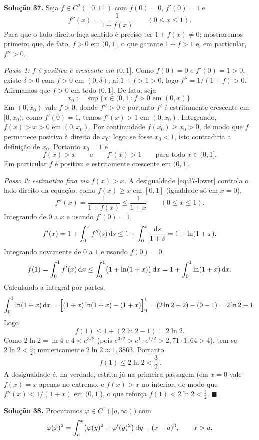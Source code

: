 \bigskip\noindent\textbf{Solução 37.}\quad
Seja $f\in C^2([0,1])$ com $f(0)=0$, $f'(0)=1$ e
\[
f''(x)=\frac{1}{1+f(x)}\qquad(0\le x\le 1).
\]
Para que o lado direito faça sentido é preciso ter $1+f(x)\neq0$; mostraremos primeiro que, de fato, $f>0$ em $(0,1]$, o que garante $1+f>1$ e, em particular, $f''>0$.

\emph{Passo 1: $f$ é positiva e crescente em $(0,1]$.}
Como $f(0)=0$ e $f'(0)=1>0$, existe $\delta>0$ com $f>0$ em $(0,\delta)$; aí $1+f>1>0$, logo $f''=1/(1+f)>0$. Afirmamos que $f>0$ em todo $(0,1]$. De fato, seja
\[
x_0:=\sup\{x\in(0,1]: f>0\text{ em }(0,x)\}.
\]
Em $(0,x_0)$ vale $f>0$, donde $f''>0$ e portanto $f'$ é estritamente crescente em $[0,x_0)$; como $f'(0)=1$, temos $f'(x)>1$ em $(0,x_0)$. Integrando, $f(x)>x>0$ em $(0,x_0)$. Por continuidade $f(x_0)\ge x_0>0$, de modo que $f$ permanece positiva à direita de $x_0$; logo, se fosse $x_0<1$, isto contradiria a definição de $x_0$. Portanto $x_0=1$ e
\begin{equation}\label{eq:37-lower}
f(x)>x\qquad\text{e}\qquad f'(x)>1\qquad\text{para todo }x\in(0,1].
\end{equation}
Em particular $f$ é positiva e estritamente crescente em $(0,1]$.

\emph{Passo 2: estimativa fina via $f(x)>x$.}
A desigualdade \eqref{eq:37-lower} controla o lado direito da equação: como $f(x)\ge x$ em $[0,1]$ (igualdade só em $x=0$),
\[
f''(x)=\frac{1}{1+f(x)}\le \frac{1}{1+x}\qquad(0\le x\le1).
\]
Integrando de $0$ a $x$ e usando $f'(0)=1$,
\[
f'(x)=1+\int_0^x f''(s)\,\mathrm{d} s\le 1+\int_0^x\frac{\mathrm{d} s}{1+s}=1+\ln(1+x).
\]
Integrando novamente de $0$ a $1$ e usando $f(0)=0$,
\[
f(1)=\int_0^1 f'(x)\,\mathrm{d} x\le \int_0^1\bigl(1+\ln(1+x)\bigr)\,\mathrm{d} x
=1+\int_0^1\ln(1+x)\,\mathrm{d} x.
\]
Calculando a integral por partes,
\[
\int_0^1\ln(1+x)\,\mathrm{d} x=\Bigl[(1+x)\ln(1+x)-(1+x)\Bigr]_0^1=(2\ln2-2)-(0-1)=2\ln2-1.
\]
Logo
\[
f(1)\le 1+(2\ln2-1)=2\ln2.
\]
Como $2\ln2=\ln4$ e $4<e^{3/2}$ (pois $e^{3/2}>e^{1}\cdot e^{1/2}>2{,}71\cdot1{,}64>4$), tem-se $2\ln2<\tfrac32$; numericamente $2\ln2\approx1{,}3863$. Portanto
\[
\boxed{\,f(1)\le 2\ln2<\frac{3}{2}\,}.
\]
A desigualdade é, na verdade, estrita já na primeira passagem (em $x=0$ vale $f(x)=x$ apenas no extremo, e $f(x)>x$ no interior, de modo que $f''(x)<1/(1+x)$ em $(0,1]$), o que reforça $f(1)<2\ln2<\tfrac32$. \qquad$\blacksquare$


\bigskip\noindent\textbf{Solução 38.}\quad
Procuramos $\varphi\in C^1([a,\infty))$ com
\begin{equation}\label{eq:38-int}
\varphi(x)^2=\int_a^x\bigl(\varphi(y)^2+\varphi'(y)^2\bigr)\,\mathrm{d} y-(x-a)^3,\qquad x>a.
\end{equation}

